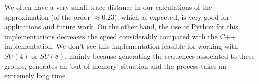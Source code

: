 \documentclass[a0,portrait]{a0poster}
\begin{document}
\begin{multicols}{2}
We often have a very small trace distance in our calculations of the approximation (of the order $ \approx 0.23 $), which as expected, is very good for applications and future work. On the other hand, the use of Python for this implementations decreases the speed considerably compared with the C++ implementation. We don't see this implementation feasible for working with $ SU(4) $ or $ SU(8) $, mainly because generating the sequences associated to these groups, generates an 'out of memory' situation and the process takes an extremely long time.  

\color{DarkSlateGray}

\printbibliography




\end{multicols}
\end{document}
